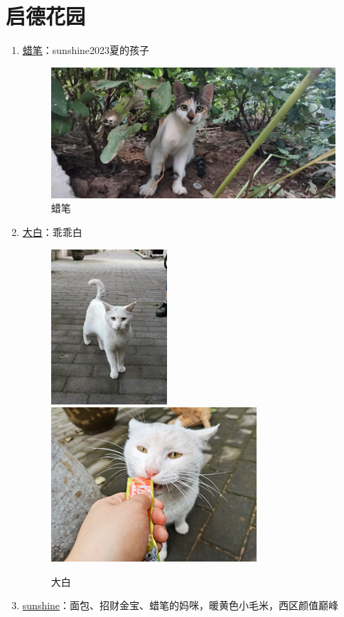 \documentclass[zihao=-4,fontset=none]{Beautybook-CN}
\begin{document}
\section{启德花园}
\begin{enumerate}
    \item \hyperref[img38]{蜡笔}：sunshine2023夏的孩子
    \begin{figure}[htbp]
            \centering
            \includegraphics[width=0.4\linewidth]{media/cimage38.png}
            \caption{蜡笔}
            \label{img38}
    \end{figure}
    \item \hyperref[img3940]{大白}：乖乖白
    \begin{figure}[htbp]
            \centering
            \includegraphics[width=0.4\linewidth]{media/cimage39.png}
        \qquad
            \includegraphics[width=0.4\linewidth]{media/cimage40.png}
            \caption{大白}
            \label{img3940}
    \end{figure}
        \item \hyperref[img4142]{sunshine}：面包、招财金宝、蜡笔的妈咪，暖黄色小毛米，西区颜值巅峰
    \begin{figure}[htbp]

\end{figure}
\end{enumerate}
\end{document}
